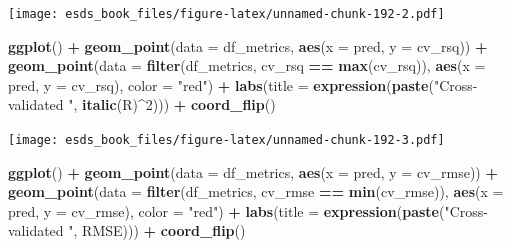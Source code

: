 \documentclass[
]{book}
\newenvironment{Shaded}{\begin{snugshade}}{\end{snugshade}}
\newcommand{\DataTypeTok}[1]{\textcolor[rgb]{0.13,0.29,0.53}{#1}}
\newcommand{\DecValTok}[1]{\textcolor[rgb]{0.00,0.00,0.81}{#1}}
\newcommand{\KeywordTok}[1]{\textcolor[rgb]{0.13,0.29,0.53}{\textbf{#1}}}
\newcommand{\NormalTok}[1]{#1}
\newcommand{\OperatorTok}[1]{\textcolor[rgb]{0.81,0.36,0.00}{\textbf{#1}}}
\newcommand{\StringTok}[1]{\textcolor[rgb]{0.31,0.60,0.02}{#1}}
\begin{document}
\texttt{[image: esds\_book\_files/figure-latex/unnamed-chunk-192-2.pdf]}

\begin{Shaded}
\begin{Highlighting}[]
\KeywordTok{ggplot}\NormalTok{() }\OperatorTok{+}
\StringTok{  }\KeywordTok{geom_point}\NormalTok{(}\DataTypeTok{data =}\NormalTok{ df_metrics, }\KeywordTok{aes}\NormalTok{(}\DataTypeTok{x =}\NormalTok{ pred, }\DataTypeTok{y =}\NormalTok{ cv_rsq)) }\OperatorTok{+}
\StringTok{  }\KeywordTok{geom_point}\NormalTok{(}\DataTypeTok{data =} \KeywordTok{filter}\NormalTok{(df_metrics, cv_rsq }\OperatorTok{==}\StringTok{ }\KeywordTok{max}\NormalTok{(cv_rsq)), }\KeywordTok{aes}\NormalTok{(}\DataTypeTok{x =}\NormalTok{ pred, }\DataTypeTok{y =}\NormalTok{ cv_rsq), }\DataTypeTok{color =} \StringTok{"red"}\NormalTok{) }\OperatorTok{+}
\StringTok{  }\KeywordTok{labs}\NormalTok{(}\DataTypeTok{title =} \KeywordTok{expression}\NormalTok{(}\KeywordTok{paste}\NormalTok{(}\StringTok{"Cross-validated "}\NormalTok{, }\KeywordTok{italic}\NormalTok{(R)}\OperatorTok{^}\DecValTok{2}\NormalTok{))) }\OperatorTok{+}\StringTok{ }
\StringTok{  }\KeywordTok{coord_flip}\NormalTok{()}
\end{Highlighting}
\end{Shaded}

\texttt{[image: esds\_book\_files/figure-latex/unnamed-chunk-192-3.pdf]}

\begin{Shaded}
\begin{Highlighting}[]
\KeywordTok{ggplot}\NormalTok{() }\OperatorTok{+}
\StringTok{  }\KeywordTok{geom_point}\NormalTok{(}\DataTypeTok{data =}\NormalTok{ df_metrics, }\KeywordTok{aes}\NormalTok{(}\DataTypeTok{x =}\NormalTok{ pred, }\DataTypeTok{y =}\NormalTok{ cv_rmse)) }\OperatorTok{+}
\StringTok{  }\KeywordTok{geom_point}\NormalTok{(}\DataTypeTok{data =} \KeywordTok{filter}\NormalTok{(df_metrics, cv_rmse }\OperatorTok{==}\StringTok{ }\KeywordTok{min}\NormalTok{(cv_rmse)), }\KeywordTok{aes}\NormalTok{(}\DataTypeTok{x =}\NormalTok{ pred, }\DataTypeTok{y =}\NormalTok{ cv_rmse), }\DataTypeTok{color =} \StringTok{"red"}\NormalTok{) }\OperatorTok{+}
\StringTok{  }\KeywordTok{labs}\NormalTok{(}\DataTypeTok{title =} \KeywordTok{expression}\NormalTok{(}\KeywordTok{paste}\NormalTok{(}\StringTok{"Cross-validated "}\NormalTok{, RMSE))) }\OperatorTok{+}\StringTok{ }
\StringTok{  }\KeywordTok{coord_flip}\NormalTok{()}
\end{Highlighting}
\end{Shaded}
\end{document}
